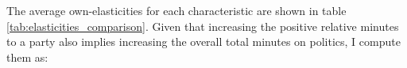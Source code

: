 \documentclass[12pt]{article}
\begin{document}

	
	
	
	
	The average own-elasticities for each characteristic are shown in table \ref{tab:elasticities_comparison}. Given that increasing the positive relative minutes to a party also implies increasing the overall total minutes on politics, I compute them as:
	
\end{document}
